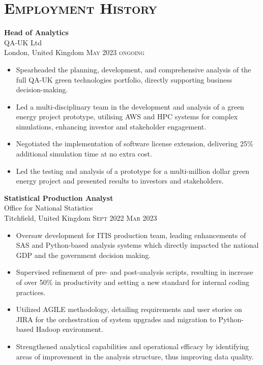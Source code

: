 \documentclass[oneside]{article}
\newcommand{\empitem}[7]{
        {\large \textbf{#1}} \\
        {{\fontseries{medium}\selectfont #2}}\\
        {{\fontseries{light}\selectfont #3}} \hfill
        {\scshape\fontseries{light}\selectfont\footnotesize #4 \textendash{} #5 #6} 
        #7
}
\begin{document}
{\begin{minipage}[t][\dimexpr\textheight-2\fboxrule-2\fboxsep\relax][t]{\dimexpr0.6\textwidth-2\fboxrule-2\fboxsep\relax}
        \section*{\scshape\Large Employment History \hrulefill}
%
        \empitem{Head of Analytics}
        {QA-UK Ltd}
        {London, United Kingdom}
        {May 2023}
        {ongoing}
        {}
        {
        \begin{itemize}
            \setlength{\itemsep}{-3pt}
            \item Spearheaded the planning, development, and comprehensive analysis of the full QA-UK green technologies portfolio, directly supporting business decision-making.
            \item Led a multi-disciplinary team in the development and analysis of a green energy project prototype, utilising AWS and HPC systems for complex simulations, enhancing investor and stakeholder engagement.
            \item Negotiated the implementation of software license extension, delivering 25\% additional simulation time at no extra cost.
            \item Led the testing and analysis of a prototype for a multi-million dollar green energy project and presented results to investors and stakeholders.
        \end{itemize}
        }
%
        \empitem {Statistical Production Analyst}
        {Office for National Statistics}
        {Titchfield, United Kingdom}
        {Sept 2022}
        {Mar 2023}
        {}
        {
        \begin{itemize}
            \setlength{\itemsep}{-3pt}
            \item Oversaw development for ITIS production team, leading enhancements of SAS and Python-based analysis systems which directly impacted the national GDP and the government decision making.
            \item Supervised refinement of pre- and post-analysis scripts, resulting in increase of over 50\% in productivity and setting a new standard for internal coding practices.
            \item Utilized AGILE methodology, detailing requirements and user stories on JIRA for the orchestration of system upgrades and migration to Python-based Hadoop environment.
            \item Strengthened analytical capabilities and operational efficacy by identifying areas of improvement in the analysis structure, thus improving data quality.

\end{itemize}}
\end{minipage}}
\end{document}
